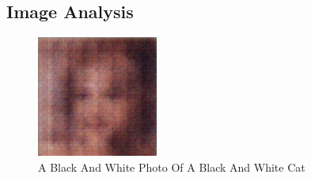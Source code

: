 \documentclass{article}%
\begin{document}
%
\subsection{Image Analysis}%
\label{subsec:ImageAnalysis}%


\begin{figure}[h!]%
\centering%
\includegraphics[width=150px]{500_fake_images/samples_5_474.png}%
\caption{A Black And White Photo Of A Black And White Cat}%
\end{figure}

%
\end{document}
